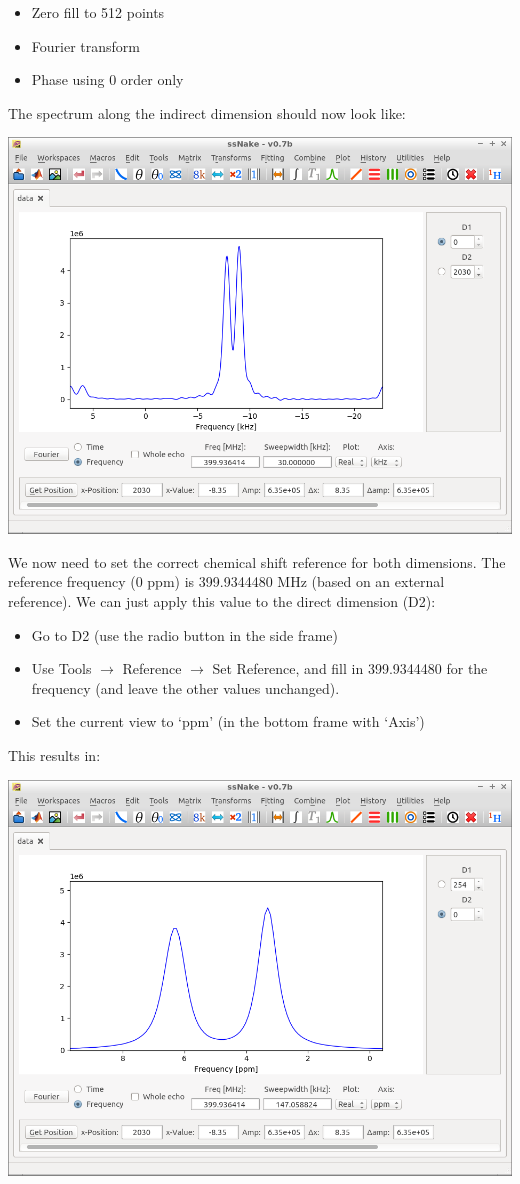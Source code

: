 \documentclass[11pt,a4paper]{article}
\begin{document}
\begin{itemize}
  \item Zero fill to 512 points
  \item Fourier transform
  \item Phase using 0 order only
\end{itemize}
The spectrum along the indirect dimension should now look like:
\begin{center}
\includegraphics[width=0.7\linewidth]{Figs/Fig5.png}
\end{center}

We now need to set the correct chemical shift reference for both dimensions.
The reference frequency (0 ppm) is  399.9344480 MHz (based on an external reference).
We can just apply this value to the direct dimension (D2):


\begin{itemize}
  \item Go to D2 (use the radio button in the side frame)
  \item Use Tools $\longrightarrow$ Reference $\longrightarrow$ Set Reference, and fill in
	 399.9344480 for the frequency (and leave the other values unchanged).
  \item Set the current view to `ppm' (in the bottom frame with `Axis')
\end{itemize}
This results in:

\begin{center}
\includegraphics[width=0.7\linewidth]{Figs/Fig6.png}
\end{center}
\end{document}

